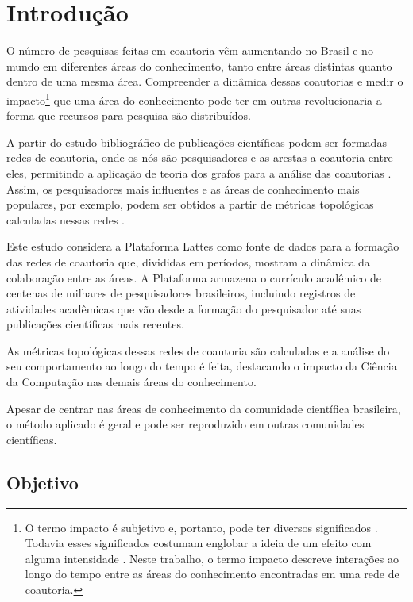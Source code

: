 \chapter[Introdução]{Introdução}

O número de pesquisas feitas em coautoria vêm aumentando no Brasil \cite{mena2014brazilian} e no mundo \cite{glanzel2003bibliometrics} em diferentes áreas do conhecimento, tanto entre áreas distintas quanto dentro de uma mesma área. Compreender a dinâmica dessas coautorias e medir o impacto\footnote{O termo impacto é subjetivo e, portanto, pode ter diversos significados \cite{roemer2015meaningful}. Todavia esses significados costumam englobar a ideia de um efeito com alguma intensidade \cite{roemer2015meaningful}. Neste trabalho, o termo impacto descreve interações ao longo do tempo entre as áreas do conhecimento encontradas em uma rede de coautoria.} que uma área do conhecimento pode ter em outras revolucionaria a forma que recursos para pesquisa são distribuídos.

A partir do estudo bibliográfico de publicações científicas podem ser formadas redes de coautoria, onde os nós são pesquisadores e as arestas a coautoria entre eles, permitindo a aplicação de teoria dos grafos para a análise das coautorias \cite{liu2005co}. Assim, os pesquisadores mais influentes e as áreas de conhecimento mais populares, por exemplo, podem ser obtidos a partir de métricas topológicas calculadas nessas redes \cite{franceschet2011collaboration}.

Este estudo considera a Plataforma Lattes como fonte de dados para a formação das redes de coautoria que, divididas em períodos, mostram a dinâmica da colaboração entre as áreas. A Plataforma armazena o currículo acadêmico de centenas de milhares de pesquisadores brasileiros, incluindo registros de atividades acadêmicas que vão desde a formação do pesquisador até suas publicações científicas mais recentes.

As métricas topológicas dessas redes de coautoria são calculadas e a análise do seu comportamento ao longo do tempo é feita, destacando o impacto da Ciência da Computação nas demais áreas do conhecimento.

Apesar de centrar nas áreas de conhecimento da comunidade científica brasileira, o método aplicado é geral e pode ser reproduzido em outras comunidades científicas.

\section{Objetivo}

